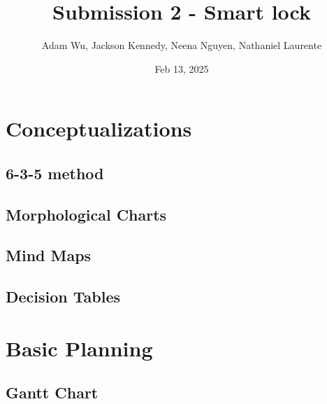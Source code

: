 \documentclass{article}
\title{Submission 2 - Smart lock} %
\author{Adam Wu, Jackson Kennedy, Neena Nguyen, Nathaniel Laurente}
\date{Feb 13, 2025}
\begin{document}
\maketitle

\tableofcontents
\newpage

\section{Conceptualizations}


\subsection{6-3-5 method}

\subsection{Morphological Charts}

\subsection{Mind Maps}

\subsection{Decision Tables}

\section{Basic Planning}
\subsection{Gantt Chart}
\end{document}
